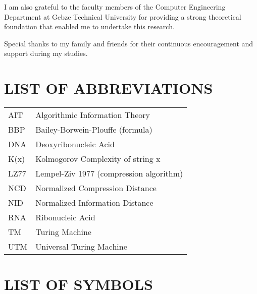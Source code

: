\documentclass[12pt,a4paper]{report}
\begin{document}
I am also grateful to the faculty members of the Computer Engineering Department at Gebze Technical University for providing a strong theoretical foundation that enabled me to undertake this research.

Special thanks to my family and friends for their continuous encouragement and support during my studies.

\tableofcontents
{}

\listoffigures
{}

\listoftables
{}

\chapter*{LIST OF ABBREVIATIONS}

\begin{tabular}{ll}
AIT & Algorithmic Information Theory\\
BBP & Bailey-Borwein-Plouffe (formula)\\
DNA & Deoxyribonucleic Acid\\
K(x) & Kolmogorov Complexity of string x\\
LZ77 & Lempel-Ziv 1977 (compression algorithm)\\
NCD & Normalized Compression Distance\\
NID & Normalized Information Distance\\
RNA & Ribonucleic Acid\\
TM & Turing Machine\\
UTM & Universal Turing Machine\\
\end{tabular}

\chapter*{LIST OF SYMBOLS}
\end{document}

